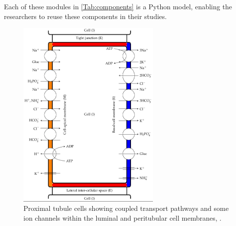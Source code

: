 \documentclass[fleqn,10pt]{physiome}
\begin{document}
Each of these modules in  \autoref{Tab:components} is a Python model, enabling the researchers to reuse these components in their studies.

\begin{figure}[ht]
\centering
\includegraphics[width=7cm]{Figure3.pdf}
\caption{Proximal tubule cells showing coupled transport pathways and some ion channels within the luminal and peritubular cell membranes, \cite[Figure 3]{noroozbabaee2022modular}.}
\label{fig:Figure3}
\end{figure}
\end{document}
